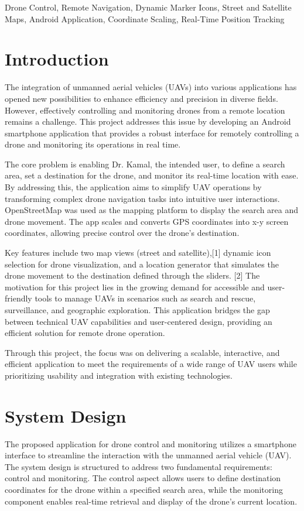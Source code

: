 \documentclass[conference]{IEEEtran}
\begin{document}
\begin{IEEEkeywords}
Drone Control, Remote Navigation, Dynamic Marker Icons, Street and Satellite Maps, Android Application, Coordinate Scaling, Real-Time Position Tracking
\end{IEEEkeywords}

\section{Introduction}
The integration of unmanned aerial vehicles (UAVs) into various applications has opened new possibilities to enhance efficiency and precision in diverse fields. However, effectively controlling and monitoring drones from a remote location remains a challenge. This project addresses this issue by developing an Android smartphone application that provides a robust interface for remotely controlling a drone and monitoring its operations in real time.

The core problem is enabling Dr. Kamal, the intended user, to define a search area, set a destination for the drone, and monitor its real-time location with ease. By addressing this, the application aims to simplify UAV operations by transforming complex drone navigation tasks into intuitive user interactions. OpenStreetMap was used as the mapping platform to display the search area and drone movement. The app scales and converts GPS coordinates into x-y screen coordinates, allowing precise control over the drone's destination.

Key features include two map views (street and satellite),[1] dynamic icon selection for drone visualization, and a location generator that simulates the drone movement to the destination defined through the sliders. [2]
The motivation for this project lies in the growing demand for accessible and user-friendly tools to manage UAVs in scenarios such as search and rescue, surveillance, and geographic exploration. This application bridges the gap between technical UAV capabilities and user-centered design, providing an efficient solution for remote drone operation.

Through this project, the focus was on delivering a scalable, interactive, and efficient application to meet the requirements of a wide range of UAV users while prioritizing usability and integration with existing technologies.

\section{System Design}
The proposed application for drone control and monitoring utilizes a smartphone interface to streamline the interaction with the unmanned aerial vehicle (UAV). The system design is structured to address two fundamental requirements: control and monitoring. The control aspect allows users to define destination coordinates for the drone within a specified search area, while the monitoring component enables real-time retrieval and display of the drone's current location.
\end{document}
